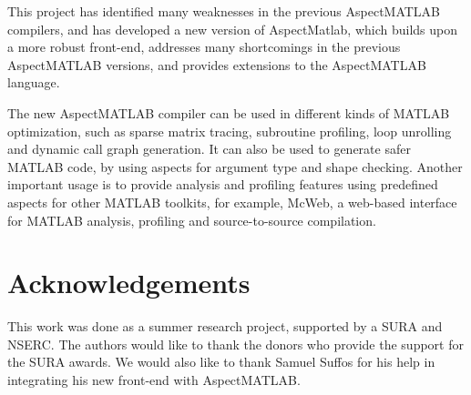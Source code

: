 \documentclass[preprint]{sig-alternate-05-2015}
\begin{document}
This project has identified many weaknesses in the previous AspectMATLAB
compilers, and has developed a new version of AspectMatlab, which builds
upon a more robust front-end, addresses many shortcomings in the
previous AspectMATLAB versions, and provides extensions to the
AspectMATLAB language.    

The new AspectMATLAB compiler can be used in different kinds of MATLAB
optimization, such as sparse matrix tracing, subroutine profiling, loop
unrolling and dynamic call graph generation. It can also be used to
generate safer  MATLAB code, by using aspects for argument type and
shape checking. Another important usage is to provide analysis and
profiling features using predefined aspects for other MATLAB toolkits,
for example, McWeb, a web-based interface for MATLAB analysis, profiling
and source-to-source compilation.

\section*{Acknowledgements}
This work was done as a summer research project, supported by a SURA and
NSERC. The authors would like to thank the donors who provide the
support for the SURA awards. We would also like to thank Samuel
Suffos for his help in integrating his new front-end with AspectMATLAB.



\end{document}
